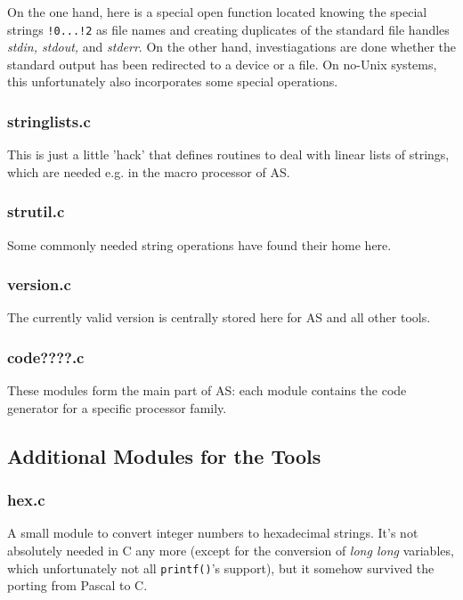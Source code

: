 \documentclass[12pt,twoside]{report}
\begin{document}
On the one hand, here is a special open function located knowing the
special strings {\tt !0...!2} as file names and creating duplicates of the
standard file handles {\em stdin, stdout,} and {\em stderr}.  On the other
hand, investiagations are done whether the standard output has been
redirected to a device or a file.  On no-Unix systems, this unfortunately
also incorporates some special operations.

\subsubsection{stringlists.c}

This is just a little 'hack' that defines routines to deal with linear
lists of strings, which are needed e.g. in the macro processor of AS.

\subsubsection{strutil.c}

Some commonly needed string operations have found their home here.

\subsubsection{version.c}

The currently valid version is centrally stored here for AS and all other
tools.

\subsubsection{code????.c}

These modules form the main part of AS: each module contains the code
generator for a specific processor family.

\subsection{Additional Modules for the Tools}

\subsubsection{hex.c}

A small module to convert integer numbers to hexadecimal strings.  It's
not absolutely needed in C any more (except for the conversion of {\em
long long} variables, which unfortunately not all {\tt printf()}'s
support), but it somehow survived the porting from Pascal to C.
\end{document}
